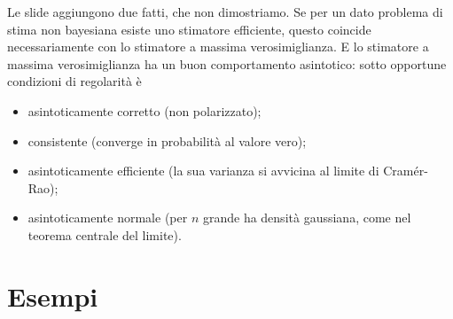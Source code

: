 Le slide aggiungono due fatti, che non dimostriamo. Se per un dato problema di stima non bayesiana esiste uno stimatore
efficiente, questo coincide necessariamente con lo stimatore a massima verosimiglianza. E lo stimatore a massima
verosimiglianza ha un buon comportamento asintotico: sotto opportune condizioni di regolarità è
\begin{itemize}
  \item asintoticamente corretto (non polarizzato);
  \item consistente (converge in probabilità al valore vero);
  \item asintoticamente efficiente (la sua varianza si avvicina al limite di Cramér-Rao);
  \item asintoticamente normale (per $n$ grande ha densità gaussiana, come nel teorema centrale del limite).
\end{itemize}

\section{Esempi}

